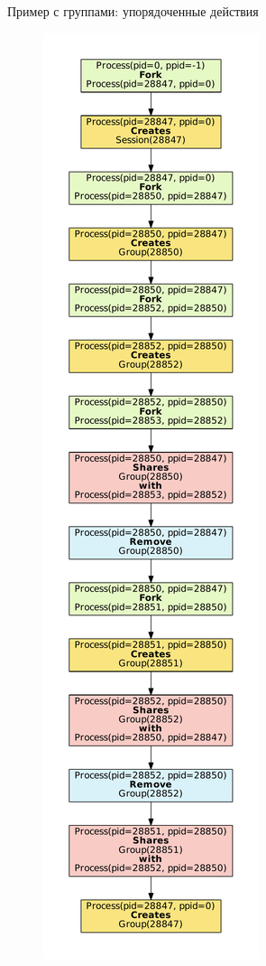 \begin{frame}{Пример с группами: упорядоченные действия}
	\begin{figure}[ht!]
	\centering
	\includegraphics[scale=0.16]{fig/exampleActSorted.pdf}
	\end{figure}
\end{frame}

